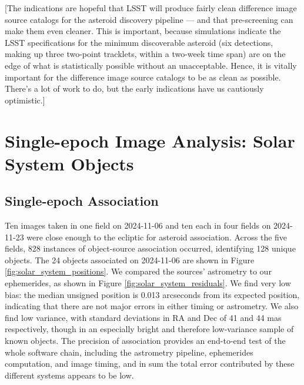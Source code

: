[The indications are hopeful that LSST will produce fairly clean difference image source catalogs for the asteroid discovery pipeline --- and that pre-screening can make them even cleaner. This is important, because simulations indicate the LSST specifications for the minimum discoverable asteroid (six detections, making up three two-point tracklets, within a two-week time span) are on the edge of what is statistically possible without an unacceptable. Hence, it is vitally important for the difference image source catalogs to be as clean as possible. There's a lot of work to do, but the early indications have us cautiously optimistic.]

\section{Single-epoch Image Analysis: Solar System Objects}
\label{sec:sia_solar_system}

\subsection{Single-epoch Association}
\label{sec:association}



Ten images taken in one field on 2024-11-06 and ten each in four fields on 2024-11-23 were close enough to the ecliptic for asteroid association. Across the five fields, 828 instances of object-source association occurred, identifying 128 unique objects. The 24 objects associated on 2024-11-06 are shown in Figure \ref{fig:solar_system_positions}. We compared the sources' astrometry to our ephemerides, as shown in Figure \ref{fig:solar_system_residuals}. We find very low bias: the median unsigned position is 0.013 arcseconds from its expected position, indicating that there are not major errors in either timing or astrometry. We also find low variance, with standard deviations in RA and Dec of 41 and 44 mas respectively, though in an especially bright and therefore low-variance sample of known objects. The precision of association provides an end-to-end test of the whole software chain, including the astrometry pipeline, ephemerides computation, and image timing, and in sum the total error contributed by these different systems appears to be low.

